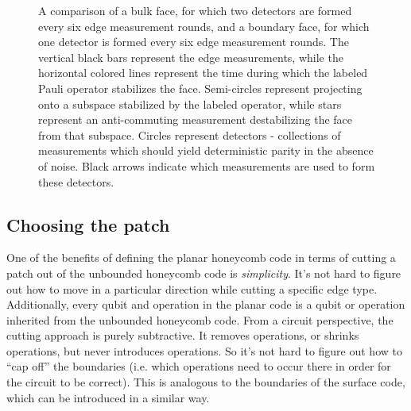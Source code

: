 \documentclass[onecolumn,unpublished,a4paper]{quantumarticle}
\theoremstyle{definition}
\theoremstyle{definition}
\theoremstyle{definition}
\begin{document}
\begin{figure}[ht!]
    \centering
    \caption{
    A comparison of a bulk face, for which two detectors are formed every six edge measurement rounds, and a boundary face, for which one detector is formed every six edge measurement rounds.  The vertical black bars represent the edge measurements, while the horizontal colored lines represent the time during which the labeled Pauli operator stabilizes the face.  Semi-circles represent projecting onto a subspace stabilized by the labeled operator, while stars represent an anti-commuting measurement destabilizing the face from that subspace.  Circles represent detectors - collections of measurements which should yield deterministic parity in the absence of noise. Black arrows indicate which measurements are used to form these detectors.
    }
    \label{fig:detectors}
\end{figure}

\subsection{Choosing the patch}
\label{sec:patches}

One of the benefits of defining the planar honeycomb code in terms of cutting a patch out of the unbounded honeycomb code is \emph{simplicity}.  
It's not hard to figure out how to move in a particular direction while cutting a specific edge type.
Additionally, every qubit and operation in the planar code is a qubit or operation inherited from the unbounded honeycomb code.
From a circuit perspective, the cutting approach is purely subtractive.
It removes operations, or shrinks operations, but never introduces operations.
So it's not hard to figure out how to ``cap off'' the boundaries (i.e. which operations need to occur there in order for the circuit to be correct).
This is analogous to the boundaries of the surface code, which can be introduced in a similar way.
\end{document}
